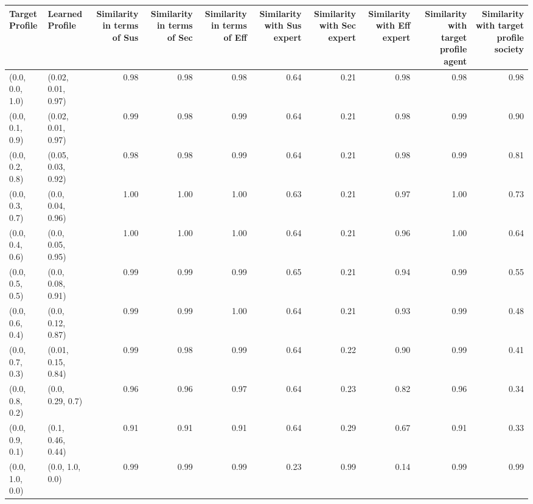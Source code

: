 \begin{tabular}{llrrrrrrrr}
\toprule
Target Profile & Learned Profile & Similarity in terms of Sus & Similarity in terms of Sec & Similarity in terms of Eff & Similarity with Sus expert & Similarity with Sec expert & Similarity with Eff expert & Similarity with target profile agent & Similarity with target profile society \\
\midrule
(0.0, 0.0, 1.0) & (0.02, 0.01, 0.97) & 0.98 & 0.98 & 0.98 & 0.64 & 0.21 & 0.98 & 0.98 & 0.98 \\
(0.0, 0.1, 0.9) & (0.02, 0.01, 0.97) & 0.99 & 0.98 & 0.99 & 0.64 & 0.21 & 0.98 & 0.99 & 0.90 \\
(0.0, 0.2, 0.8) & (0.05, 0.03, 0.92) & 0.98 & 0.98 & 0.99 & 0.64 & 0.21 & 0.98 & 0.99 & 0.81 \\
(0.0, 0.3, 0.7) & (0.0, 0.04, 0.96) & 1.00 & 1.00 & 1.00 & 0.63 & 0.21 & 0.97 & 1.00 & 0.73 \\
(0.0, 0.4, 0.6) & (0.0, 0.05, 0.95) & 1.00 & 1.00 & 1.00 & 0.64 & 0.21 & 0.96 & 1.00 & 0.64 \\
(0.0, 0.5, 0.5) & (0.0, 0.08, 0.91) & 0.99 & 0.99 & 0.99 & 0.65 & 0.21 & 0.94 & 0.99 & 0.55 \\
(0.0, 0.6, 0.4) & (0.0, 0.12, 0.87) & 0.99 & 0.99 & 1.00 & 0.64 & 0.21 & 0.93 & 0.99 & 0.48 \\
(0.0, 0.7, 0.3) & (0.01, 0.15, 0.84) & 0.99 & 0.98 & 0.99 & 0.64 & 0.22 & 0.90 & 0.99 & 0.41 \\
(0.0, 0.8, 0.2) & (0.0, 0.29, 0.7) & 0.96 & 0.96 & 0.97 & 0.64 & 0.23 & 0.82 & 0.96 & 0.34 \\
(0.0, 0.9, 0.1) & (0.1, 0.46, 0.44) & 0.91 & 0.91 & 0.91 & 0.64 & 0.29 & 0.67 & 0.91 & 0.33 \\
(0.0, 1.0, 0.0) & (0.0, 1.0, 0.0) & 0.99 & 0.99 & 0.99 & 0.23 & 0.99 & 0.14 & 0.99 & 0.99 \\
\bottomrule
\end{tabular}
